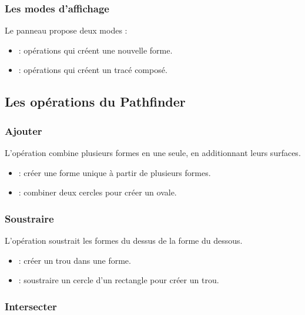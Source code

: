 \subsubsection{Les modes d'affichage}

Le panneau propose deux modes :

\begin{itemize}
    \item {} : opérations qui créent une nouvelle forme.
    \item {} : opérations qui créent un tracé composé.
\end{itemize}

\subsection{Les opérations du Pathfinder}

\subsubsection{Ajouter}

L'opération  combine plusieurs formes en une seule, en additionnant leurs surfaces.

\begin{itemize}
    \item {} : créer une forme unique à partir de plusieurs formes.
    \item {} : combiner deux cercles pour créer un ovale.
\end{itemize}

\subsubsection{Soustraire}

L'opération  soustrait les formes du dessus de la forme du dessous.

\begin{itemize}
    \item {} : créer un trou dans une forme.
    \item {} : soustraire un cercle d'un rectangle pour créer un trou.
\end{itemize}

\subsubsection{Intersecter}

